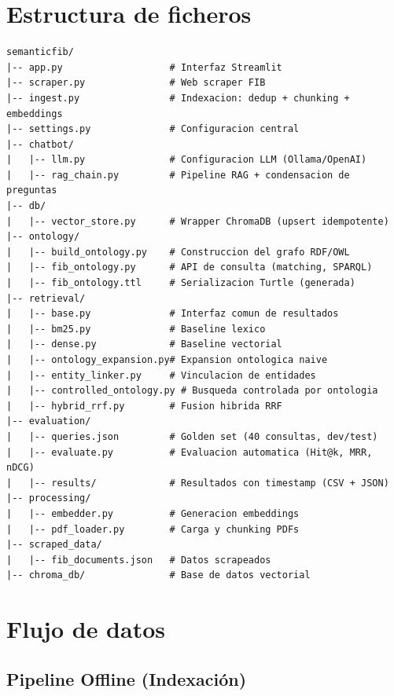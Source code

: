 \documentclass[12pt, a4paper, twoside]{report}
\begin{document}
\section{Estructura de ficheros}

\begin{lstlisting}[language={}, caption={Estructura del proyecto}, label={lst:structure}]
semanticfib/
|-- app.py                   # Interfaz Streamlit
|-- scraper.py               # Web scraper FIB
|-- ingest.py                # Indexacion: dedup + chunking + embeddings
|-- settings.py              # Configuracion central
|-- chatbot/
|   |-- llm.py               # Configuracion LLM (Ollama/OpenAI)
|   |-- rag_chain.py         # Pipeline RAG + condensacion de preguntas
|-- db/
|   |-- vector_store.py      # Wrapper ChromaDB (upsert idempotente)
|-- ontology/
|   |-- build_ontology.py    # Construccion del grafo RDF/OWL
|   |-- fib_ontology.py      # API de consulta (matching, SPARQL)
|   |-- fib_ontology.ttl     # Serializacion Turtle (generada)
|-- retrieval/
|   |-- base.py              # Interfaz comun de resultados
|   |-- bm25.py              # Baseline lexico
|   |-- dense.py             # Baseline vectorial
|   |-- ontology_expansion.py# Expansion ontologica naive
|   |-- entity_linker.py     # Vinculacion de entidades
|   |-- controlled_ontology.py # Busqueda controlada por ontologia
|   |-- hybrid_rrf.py        # Fusion hibrida RRF
|-- evaluation/
|   |-- queries.json         # Golden set (40 consultas, dev/test)
|   |-- evaluate.py          # Evaluacion automatica (Hit@k, MRR, nDCG)
|   |-- results/             # Resultados con timestamp (CSV + JSON)
|-- processing/
|   |-- embedder.py          # Generacion embeddings
|   |-- pdf_loader.py        # Carga y chunking PDFs
|-- scraped_data/
|   |-- fib_documents.json   # Datos scrapeados
|-- chroma_db/               # Base de datos vectorial
\end{lstlisting}

\section{Flujo de datos}

\subsection{Pipeline Offline (Indexaci\'on)}
\end{document}
